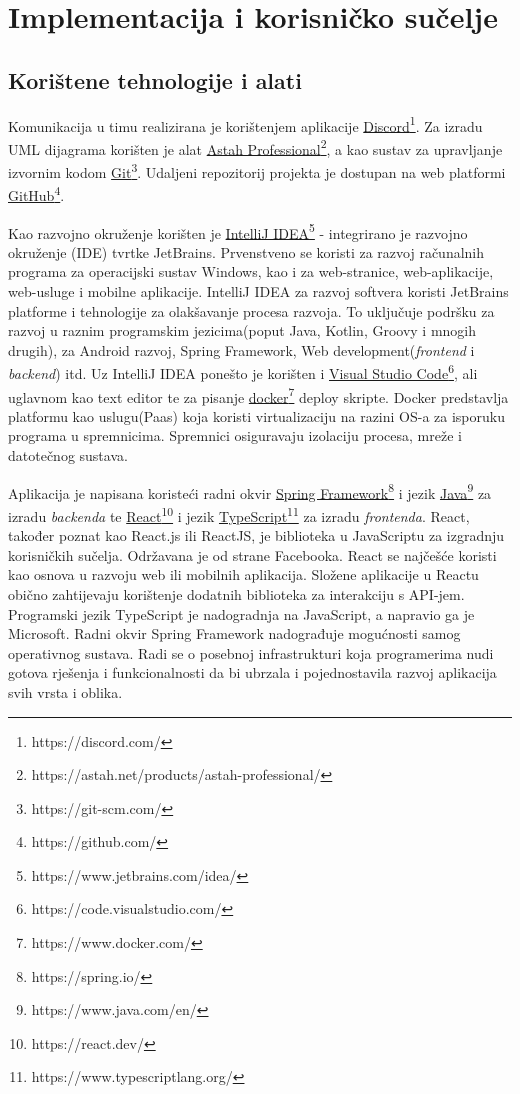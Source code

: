 \chapter{Implementacija i korisničko sučelje}


\section{Korištene tehnologije i alati}

Komunikacija u timu realizirana je korištenjem aplikacije \underline{Discord}\footnote{https://discord.com/}. Za izradu UML dijagrama korišten je alat \underline{Astah Professional}\footnote{https://astah.net/products/astah-professional/}, a kao sustav za upravljanje izvornim kodom \underline{Git}\footnote{https://git-scm.com/}. Udaljeni repozitorij projekta je dostupan na web platformi \underline{GitHub}\footnote{https://github.com/}.

Kao razvojno okruženje korišten je \underline{IntelliJ IDEA}\footnote{https://www.jetbrains.com/idea/} - integrirano je razvojno \newline okruženje (IDE) tvrtke JetBrains. Prvenstveno se koristi za razvoj računalnih programa za operacijski sustav Windows, kao i za web-stranice, web-aplikacije, web-usluge i mobilne aplikacije. IntelliJ IDEA za razvoj softvera koristi JetBrains platforme i tehnologije za olakšavanje procesa razvoja. To uključuje podršku za razvoj u raznim programskim jezicima(poput Java, Kotlin, Groovy i mnogih drugih), za Android razvoj, Spring Framework, Web development(\textit{frontend} i \textit{backend}) itd. Uz IntelliJ IDEA ponešto je korišten i \underline{Visual Studio Code}\footnote{https://code.visualstudio.com/}, ali uglavnom kao text editor te za pisanje \underline{docker}\footnote{https://www.docker.com/} deploy skripte. Docker predstavlja platformu kao uslugu(Paas) koja koristi virtualizaciju na razini OS-a za isporuku programa u spremnicima. Spremnici osiguravaju izolaciju procesa, mreže i datotečnog sustava.

Aplikacija je napisana koristeći radni okvir \underline{Spring Framework}\footnote{https://spring.io/} i jezik \underline{Java}\footnote{https://www.java.com/en/} za izradu \textit{backenda} te \underline{React}\footnote{https://react.dev/} i jezik \underline{TypeScript}\footnote{https://www.typescriptlang.org/} za izradu \textit{frontenda}. React, također poznat kao React.js ili ReactJS, je biblioteka u JavaScriptu za izgradnju korisničkih sučelja. Održavana je od strane Facebooka. React se najčešće koristi kao osnova u razvoju web ili mobilnih aplikacija. Složene aplikacije u Reactu obično zahtijevaju korištenje dodatnih biblioteka za interakciju s API-jem. Programski jezik TypeScript je nadogradnja na JavaScript, a napravio ga je Microsoft. Radni okvir Spring Framework nadograđuje mogućnosti samog operativnog sustava. Radi se o posebnoj infrastrukturi koja programerima nudi gotova rješenja i funkcionalnosti da bi ubrzala i pojednostavila razvoj aplikacija svih vrsta i oblika.

